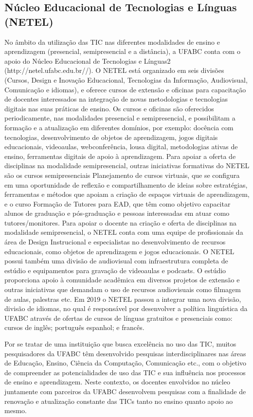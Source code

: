 \subsection{Núcleo Educacional de Tecnologias e Línguas (NETEL)}
No âmbito da utilização das TIC nas diferentes modalidades de ensino e aprendizagem (presencial, semipresencial e a distância), a UFABC conta com o apoio do Núcleo Educacional de Tecnologias e Línguas2 (http://netel.ufabc.edu.br//). O NETEL está organizado em seis divisões (Cursos, Design e Inovação Educacional, Tecnologias da Informação, Audiovisual, Comunicação e idiomas), e oferece cursos de extensão e oficinas para capacitação de docentes interessados na integração de novas metodologias e tecnologias digitais nas suas práticas de ensino. Os cursos e oficinas são oferecidos periodicamente, nas modalidades presencial e semipresencial, e possibilitam a formação e a atualização em diferentes domínios, por exemplo: docência com tecnologias, desenvolvimento de objetos de aprendizagem, jogos digitais educacionais, videoaulas, webconferência, lousa digital, metodologias ativas de ensino, ferramentas digitais de apoio à aprendizagem. Para apoiar a oferta de disciplinas na modalidade semipresencial, outras iniciativas formativas do NETEL são os cursos semipresenciais Planejamento de cursos virtuais, que se configura em uma oportunidade de reflexão e compartilhamento de ideias sobre estratégias, ferramentas e métodos que apoiam a criação de espaços virtuais de aprendizagem, e o curso Formação de Tutores para EAD, que têm como objetivo capacitar alunos de graduação e pós-graduação e pessoas interessadas em atuar como tutores/monitores. Para apoiar o docente na criação e oferta de disciplinas na modalidade semipresencial, o NETEL conta com uma equipe de profissionais da área de Design Instrucional e especialistas no desenvolvimento de recursos educacionais, como objetos de aprendizagem e jogos educacionais. O NETEL possui também uma divisão de audiovisual com infraestrutura completa de estúdio e equipamentos para gravação de videoaulas e podcasts. O estúdio proporciona apoio à comunidade acadêmica em diversos projetos de extensão e outras iniciativas que demandam o uso de recursos audiovisuais como filmagem de aulas, palestras etc. Em 2019 o NETEL passou a integrar uma nova divisão, divisão de idiomas, no qual é responsável por desenvolver a política linguística da UFABC através de ofertas de cursos de línguas gratuitos e presenciais como: cursos de inglês; português espanhol; e francês.

Por se tratar de uma instituição que busca excelência no uso das TIC, muitos pesquisadores da UFABC têm desenvolvido pesquisas interdisciplinares nas áreas de Educação, Ensino, Ciência da Computação, Comunicação etc., com o objetivo de compreender as potencialidades de uso das TIC e sua influência nos processos de ensino e aprendizagem. Neste contexto, os docentes envolvidos no núcleo juntamente com parceiros da UFABC desenvolvem pesquisas com a finalidade de renovação e atualização constante das TICs tanto no ensino quanto apoio ao mesmo.

